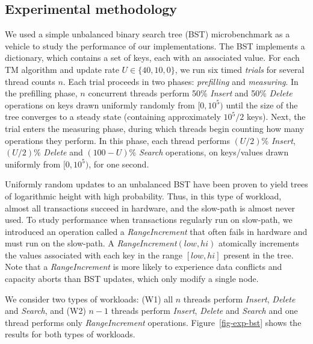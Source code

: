 \subsection{Experimental methodology}
We used a simple unbalanced binary search tree (BST) microbenchmark as a vehicle to study the performance of our implementations.
The BST implements a dictionary, which contains a set of keys, each with an associated value.
For each TM algorithm %
and update rate $U \in \{40, 10, 0\}$, we run six timed \textit{trials} for several thread counts $n$.
Each trial proceeds in two phases: \textit{prefilling} and \textit{measuring}.
In the prefilling phase, $n$ concurrent threads perform 50\% \textit{Insert} and 50\% \textit{Delete} operations on keys drawn uniformly randomly from $[0, 10^5)$ until the size of the tree converges to a steady state (containing approximately $10^5/2$ keys).
Next, the trial enters the measuring phase, during which threads begin counting how many operations they perform.
In this phase, each thread performs $(U/2)$\% \textit{Insert}, $(U/2)$\% \textit{Delete} and $(100-U)$\% \textit{Search} operations, on keys/values drawn uniformly from $[0,10^5)$, for one second.

Uniformly random updates to an unbalanced BST have been proven to yield trees of logarithmic height with high probability.
Thus, in this type of workload, almost all transactions succeed in hardware, and the slow-path is almost never used.
To study performance when transactions regularly run on slow-path, we introduced an operation called a \textit{RangeIncrement} that often fails in hardware and must run on the slow-path.
A \textit{RangeIncrement}$(low, hi)$ atomically increments the values 
associated with each key in the range $[low, hi]$ present in the tree.
Note that a \textit{RangeIncrement} is more likely to experience data 
conflicts and capacity aborts than BST updates, which only modify a single node.

We consider two types of workloads: (W1) all $n$ threads perform \textit{Insert}, \textit{Delete} and \textit{Search}, and (W2) $n-1$ threads perform \textit{Insert}, \textit{Delete} and \textit{Search} and one thread performs only \textit{RangeIncrement} operations.
Figure~\ref{fig-exp-bst} shows the results for both types of workloads.

